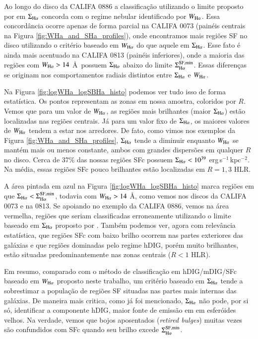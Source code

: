 Ao longo do disco da CALIFA 0886 a classificação utilizando o limite proposto por \citet{Zhang.etal.2017a} em $\Sigma_{\Ha}$ concorda com o regime nebular identificado por $W_{\Ha}$. Essa concordância ocorre apenas de forma parcial na CALIFA 0073 (painéis centrais na Figura \ref{fig:WHa_and_SHa_profiles}), onde encontramos mais regiões SF no disco utilizando o critério baseado em $W_{\Ha}$ do que aquele em $\Sigma_{\Ha}$. Esse fato é ainda mais acentuado na CALIFA 0813 (painéis inferiores), onde a maioria das regiões com $W_{\Ha} > 14$ \AA\ possuem $\Sigma_{\Ha}$ abaixo do limite $\Sigma^{\rm SF,min}_{\Ha}$. Essas diferenças se originam nos comportamentos radiais distintos entre $\Sigma_{\Ha}$ e $W_{\Ha}$.

Na Figura \ref{fig:logWHa_logSBHa_histo} podemos ver tudo isso de forma estatística. Os pontos representam as zonas em nossa amostra, coloridos por $R$. Vemos que para um valor de $W_{\Ha}$, as regiões mais brilhantes (maior $\Sigma_{\Ha}$) estão localizadas nas regiões centrais. Já para um valor fixo de $\Sigma_{\Ha}$, os maiores valores de $W_{\Ha}$ tendem a estar nos arredores. De fato, como vimos nos exemplos da Figura \ref{fig:WHa_and_SHa_profiles}, $\Sigma_{\Ha}$ tende a diminuir enquanto $W_{\Ha}$ se mantém mais ou menos constante, ambos com grandes dispersões em qualquer $R$ no disco. Cerca de 37\% das nossas regiões SFc possuem $\Sigma_{\Ha} < 10^{39}$ erg$\,$s$^{-1}\,$kpc$^{-2}$. Na média, essas regiões SFc pouco brilhantes estão localizadas em $R = 1,3$ HLR.

A área pintada em azul na Figura \ref{fig:logWHa_logSBHa_histo} marca regiões em que $\Sigma_{\Ha} < \Sigma^{\rm SF,min}_{\Ha}$, todavia com $W_{\Ha} > 14$ \AA, como vemos nos discos da CALIFA 0073 e na 0813. Se apoiando no exemplo da CALIFA 0886, vemos na área vermelha, regiões que seriam classificadas erroneamente utilizando o limite baseado em $\Sigma_{\Ha}$ proposto por \citet{Zhang.etal.2017a}.
Também podemos ver, agora com relevância estatística, que regiões SFc com baixo brilho ocorrem nas partes exteriores das galáxias e que regiões dominadas pelo regime hDIG, porém muito brilhantes, estão situadas predominantemente nas zonas centrais ($R < 1$ HLR).

Em resumo, comparado com o método de classificação em hDIG/mDIG/SFc baseado em $W_{\Ha}$ proposto neste trabalho, um critério baseado em $\Sigma_{\Ha}$ tende a sobrestimar a população de regiões SF situadas nas partes mais internas das galáxias. De maneira mais critica, como já foi mencionado, $\Sigma_{\Ha}$ não pode, por si só, identificar a componente hDIG, maior fonte de emissão em \Ha em  esferóides velhos. Na verdade, vemos que bojos aposentados ({\em retired bulges}) muitas vezes são confundidos com SFc quando seu brilho excede $\Sigma^{\rm SF,min}_{\Ha}$.

